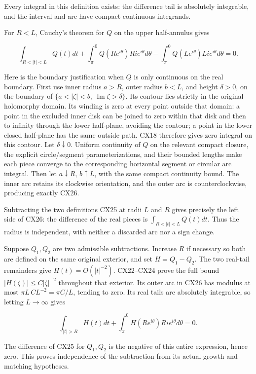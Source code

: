 \documentclass[
  11pt,
]{article}
\begin{document}
Every integral in this definition exists: the difference tail is
absolutely integrable, and the interval and arc have compact continuous
integrands.

For \(R<L\), Cauchy's theorem for \(Q\) on the upper half-annulus gives

\[
\int_{R<|t|<L}Q(t)dt
 +\int_{\pi}^{0}Q(Re^{i\theta})Ri e^{i\theta}d\theta
 -\int_{\pi}^{0}Q(Le^{i\theta})Li e^{i\theta}d\theta=0 .
\tag{CX26}
\]

Here is the boundary justification when \(Q\) is only continuous on the
real boundary. First use inner radius \(a>R\), outer radius \(b<L\), and
height \(\delta>0\), on the boundary of
\(\{a<|\zeta|<b,\ \operatorname{Im}\zeta>\delta\}\). Its contour lies
strictly in the original holomorphy domain. Its winding is zero at every
point outside that domain: a point in the excluded inner disk can be
joined to zero within that disk and then to infinity through the lower
half-plane, avoiding the contour; a point in the lower closed half-plane
has the same outside path. CX18 therefore gives zero integral on this
contour. Let \(\delta\downarrow0\). Uniform continuity of \(Q\) on the
relevant compact closure, the explicit circle/segment parameterizations,
and their bounded lengths make each piece converge to the corresponding
horizontal segment or circular arc integral. Then let \(a\downarrow R\),
\(b\uparrow L\), with the same compact continuity bound. The inner arc
retains its clockwise orientation, and the outer arc is
counterclockwise, producing exactly CX26.

Subtracting the two definitions CX25 at radii \(L\) and \(R\) gives
precisely the left side of CX26: the difference of the real pieces is
\(\int_{R<|t|<L}Q(t)dt\). Thus the radius is independent, with neither a
discarded arc nor a sign change.

Suppose \(Q_1,Q_2\) are two admissible subtractions. Increase \(R\) if
necessary so both are defined on the same original exterior, and set
\(H=Q_1-Q_2\). The two real-tail remainders give \(H(t)=O(|t|^{-2})\).
CX22--CX24 prove the full bound \(|H(\zeta)|\leq C|\zeta|^{-2}\)
throughout that exterior. Its outer arc in CX26 has modulus at most
\(\pi L\,CL^{-2}=\pi C/L\), tending to zero. Its real tails are
absolutely integrable, so letting \(L\to\infty\) gives

\[
\int_{|t|>R}H(t)dt
 +\int_\pi^0H(Re^{i\theta})Ri e^{i\theta}d\theta=0 .
\tag{CX27}
\]

The difference of CX25 for \(Q_1,Q_2\) is the negative of this entire
expression, hence zero. This proves independence of the subtraction from
its actual growth and matching hypotheses.
\end{document}
